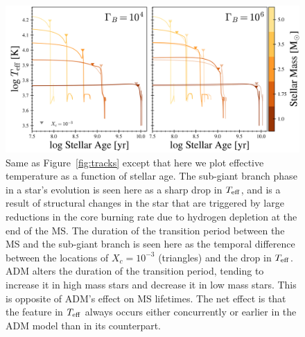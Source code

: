 \documentclass[useAMS,usenatbib]{mnras}
\begin{document}
\begin{figure}
  \centering
  \includegraphics[width=\textwidth]{plots/Teff.png}
  \caption{
  Same as Figure~\ref{fig:tracks} except that here we plot effective temperature as a function of stellar age. The sub-giant branch phase in a star's evolution is seen here as a sharp drop in $T_{\mathrm{eff}}$, and is a result of structural changes in the star that are triggered by large reductions in the core burning rate due to hydrogen depletion at the end of the MS. The duration of the transition period between the MS and the sub-giant branch is seen here as the temporal difference between the locations of $X_c = 10^{-3}$ (triangles) and the drop in $T_{\mathrm{eff}}$. ADM alters the duration of the transition period, tending to increase it in high mass stars and decrease it in low mass stars. This is opposite of ADM's effect on MS lifetimes. The net effect is that the feature in $T_{\mathrm{eff}}$ always occurs either concurrently or earlier in the ADM model than in its \nodm counterpart.
  }
  \label{fig:teff}
\end{figure}

\end{document}
